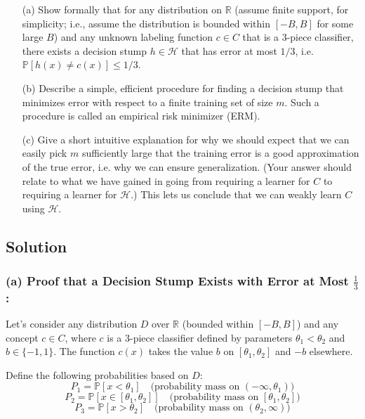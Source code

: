 \documentclass{article}
\begin{document}
\begin{enumerate}
    \item[(a)] Show formally that for any distribution on \(\mathbb{R}\) (assume finite support, for simplicity; i.e., assume the distribution is bounded within \([-B, B]\) for some large \(B\)) and any unknown labeling function \(c \in C\) that is a 3-piece classifier, there exists a decision stump \(h \in \mathcal{H}\) that has error at most \(1/3\), i.e. \(\mathbb{P}[h(x) \neq c(x)] \leq 1/3\).
    \item[(b)] Describe a simple, efficient procedure for finding a decision stump that minimizes error with respect to a finite training set of size \(m\). Such a procedure is called an empirical risk minimizer (ERM).
    \item[(c)] Give a short intuitive explanation for why we should expect that we can easily pick \(m\) sufficiently large that the training error is a good approximation of the true error, i.e. why we can ensure generalization. (Your answer should relate to what we have gained in going from requiring a learner for \(C\) to requiring a learner for \(\mathcal{H}\).) This lets us conclude that we can weakly learn \(C\) using \(\mathcal{H}\).
\end{enumerate}

\subsection*{Solution}

\subsubsection*{(a) Proof that a Decision Stump Exists with Error at Most \(\frac{1}{3}\):}

Let’s consider any distribution \(D\) over \(\mathbb{R}\) (bounded within \([-B, B]\)) and any concept \(c \in C\), where \(c\) is a 3-piece classifier defined by parameters \(\theta_1 < \theta_2\) and \(b \in \{-1, 1\}\). The function \(c(x)\) takes the value \(b\) on \([\theta_1, \theta_2]\) and \(-b\) elsewhere.

Define the following probabilities based on \(D\):
\[
P_1 = \mathbb{P}[x < \theta_1] \quad \text{(probability mass on } (-\infty, \theta_1))
\]
\[
P_2 = \mathbb{P}[x \in [\theta_1, \theta_2]] \quad \text{(probability mass on } [\theta_1, \theta_2])
\]
\[
P_3 = \mathbb{P}[x > \theta_2] \quad \text{(probability mass on } (\theta_2, \infty))
\]
\end{document}
